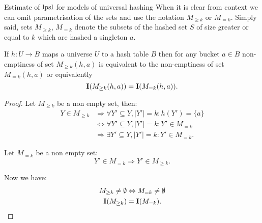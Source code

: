 \begin{section}{Estimate of $\mathrm{lpsl}$ for models of universal hashing}
When it is clear from context we can omit parametrisation of the sets and use the notation $M_{\geq k}$ or $M_{= k}$. Simply said, sets $M_{\geq k}$, $M_{= k}$ denote the subsets of the hashed set $S$ of size greater or equal to $k$ which are hashed a singleton $a$. 

\begin{lemma}
\label{lemma-indicator-k-collision}
If $h: U \rightarrow B$ maps a universe $U$ to a hash table $B$ then for any bucket $a \in B$ non-emptiness of set $M_{\geq k}(h, a)$ is equivalent to the non-emptiness of set $M_{= k}(h, a)$ or equivalently
\begin{displaymath}
\mathbf{I}(M_{\geq k}(h, a)) = \mathbf{I}(M_{= k}(h, a)) \text{.}
\end{displaymath}
\begin{proof}
Let $M_{\geq k}$ be a non empty set, then:
\begin{displaymath}
\begin{split}
Y \in M_{\geq k} 
	& \Rightarrow \forall Y' \subseteq Y, |Y'| = k: h(Y') = \{a\} \\
	& \Leftrightarrow \forall Y' \subseteq Y, |Y'| = k: Y' \in M_{=k} \\
	& \Rightarrow \exists Y' \subseteq Y, |Y'| = k: Y' \in M_{=k} \text{.}
\end{split}
\end{displaymath}

Let $M_{=k}$ be a non empty set:
\begin{displaymath}
Y' \in M_{=k} \Rightarrow Y' \in M_{\geq k} \text{.}
\end{displaymath}

Now we have:
\begin{displaymath}
\begin{split}
M_{\geq k} \neq \emptyset & \Leftrightarrow  M_{= k} \neq \emptyset \\
\mathbf{I}(M_{\geq k}) & = \mathbf{I}(M_{= k}) \text{.}
\end{split}
\end{displaymath}
\end{proof}
\end{lemma}


\end{section}
